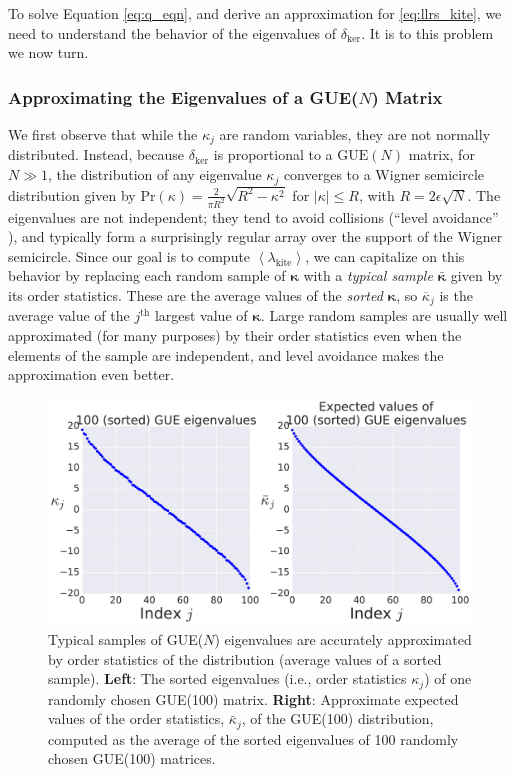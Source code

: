 \documentclass[aps,pra, twocolumn]{revtex4-1}
\newcommand{\expect}[1]{\ensuremath{\left\langle#1\right\rangle}}
\newcommand{\bvec}[1]{\boldsymbol{#1}}
\begin{document}
To solve Equation \eqref{eq:q_eqn}, and derive an approximation for \eqref{eq:llrs_kite}, we need to understand the behavior of the eigenvalues of $\delta_{\mathrm{ker}}$. It is to this problem we now turn.

\subsubsection{Approximating the Eigenvalues of a GUE($N$) Matrix}
We first observe that while the $\kappa_j$ are random variables, they are not normally distributed.  Instead, because $\delta_{\mathrm{ker}}$ is proportional to a $\mathrm{GUE}(N)$ matrix, for $N\gg1$, the distribution of any eigenvalue $\kappa_{j}$
converges to a Wigner semicircle distribution \cite{Wigner1958} given by $\mathrm{Pr}(\kappa) = \frac{2}{\pi R^{2}}\sqrt{R^{2}-\kappa^{2}}$ for $|\kappa| \leq R$, with $R = 2\epsilon\sqrt{N}$.  The eigenvalues are not independent; they tend to avoid collisions (``level avoidance'' \cite{Tao2013}), 
and typically form a surprisingly regular array over the support of the Wigner semicircle.  Since our goal is to compute $\expect{\lambda_{\mathrm{kite}}}$, we can capitalize on this behavior by replacing each random sample of $\bvec{\kappa}$ with a 
\emph{typical sample} $\bar{\bvec{\kappa}}$ given by its order statistics.  These are the average values of the \emph{sorted} 
$\bvec{\kappa}$, so $\overline{\kappa}_j$ is the average value of the $j^{\mathrm{th}}$ largest value of $\bvec{\kappa}$.  Large random samples 
are usually well approximated (for many purposes) by their order statistics even when the elements of the sample are 
independent, and level avoidance makes the approximation even better. 

\begin{figure}[h!]
\includegraphics[width=\columnwidth]{Images/Figure_4.pdf}
\caption{Typical samples of GUE($N$) eigenvalues are accurately approximated by order statistics of the distribution (average values of a sorted sample).  \textbf{Left}:  The sorted eigenvalues (i.e., order statistics $\kappa_{j}$) of one randomly chosen GUE(100) matrix.  \textbf{Right}:  Approximate expected values of the order statistics, $\bar{\kappa}_{j}$, of the GUE(100) distribution, computed as the average of the sorted eigenvalues of 100 randomly chosen GUE(100) matrices.}
\label{fig:orderstatistics1}
\end{figure}
\end{document}
